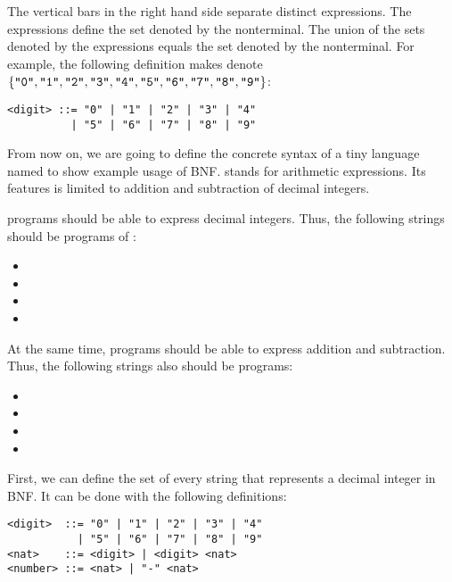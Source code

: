 The vertical bars in the right hand side separate distinct expressions.
The expressions define the set denoted by the nonterminal. The union of the sets
denoted by the expressions equals the set denoted by the nonterminal. For
example, the following definition makes  denote
$\{\texttt{"0"},\texttt{"1"},\texttt{"2"},\texttt{"3"},\texttt{"4"},\texttt{"5"},\texttt{"6"},\texttt{"7"},\texttt{"8"},\texttt{"9"}\}$:

\begin{verbatim}
<digit> ::= "0" | "1" | "2" | "3" | "4"
          | "5" | "6" | "7" | "8" | "9"
\end{verbatim}

From now on, we are going to define the concrete syntax of a tiny language named
\lang to show example usage of BNF. \lang stands for arithmetic expressions. Its
features is limited to addition and subtraction of decimal integers.

\lang programs should be able to express decimal integers. Thus, the
following strings should be programs of \lang:

\begin{itemize}
  \item {}
  \item {}
  \item {}
  \item {}
\end{itemize}

At the same time, programs should be able to express addition and subtraction.
Thus, the following strings also should be programs:

\begin{itemize}
  \item {}
  \item {}
  \item {}
  \item {}
\end{itemize}

First, we can define the set of every string that represents a decimal integer
in BNF. It can be done with the following definitions:

\begin{verbatim}
<digit>  ::= "0" | "1" | "2" | "3" | "4"
           | "5" | "6" | "7" | "8" | "9"
<nat>    ::= <digit> | <digit> <nat>
<number> ::= <nat> | "-" <nat>
\end{verbatim}

